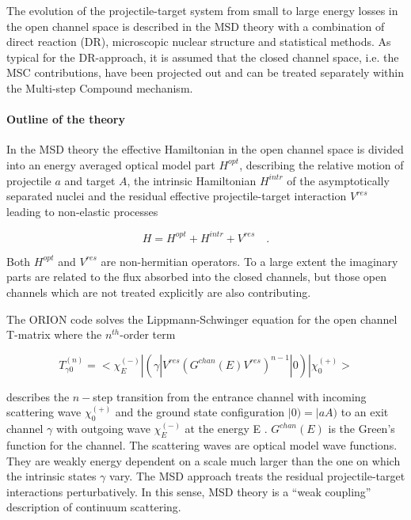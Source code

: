 \documentclass[twocolumn,amsmath,amssymb,10pt,groupedaddress,a4paper]{revtex4}
\begin{document}
The evolution of the projectile-target system from small to large
energy losses in the open channel space is described in the MSD theory
with a combination of direct reaction (DR), microscopic nuclear structure
and statistical methods. As typical for the DR-approach, it is assumed
that the closed channel space, i.e. the MSC contributions,
have been projected out and can be treated separately within the Multi-step
Compound mechanism.


\paragraph{\label{sec: MSD}Outline of the theory}

In the MSD theory the effective Hamiltonian in the open
channel space is divided into an energy averaged optical model part
$H^{opt}$, describing the relative motion of projectile $a$ and
target $A$, the intrinsic Hamiltonian $H^{intr}$ of the asymptotically
separated nuclei and the residual effective projectile-target interaction
$V^{res}$ leading to non-elastic processes

\begin{equation}
H=H^{opt}+H^{intr}+V^{res}\quad.\label{fullh}
\end{equation}

\noindent Both $H^{opt}$ and $V^{res}$ are non-hermitian operators. To a large
extent the imaginary parts are related to the flux absorbed into the
closed channels, but those open channels which are not treated explicitly
are also contributing.

The ORION code solves the Lippmann-Schwinger equation
for the open channel T-matrix where the $n^{th}$-order term

\begin{equation}
T_{\gamma0}^{(n)}=<\chi_{E}^{(-)}|(\gamma|V^{res}(G^{chan}(E)V^{res})^{n-1}|0)|\chi_{0}^{(+)}>\label{tgamman}\end{equation}

\noindent describes the $n-$step transition from the entrance channel with
incoming scattering wave $\chi_{0}^{(+)}$ and the ground state configuration
$|0)=|aA)$ to an exit channel $\gamma$ with outgoing wave $\chi_{E}^{(-)}$
at the energy E \cite{SLW,LW92}. $G^{chan}(E)$ is the Green's function
for the channel. The scattering waves are optical model wave functions.
They are weakly energy dependent on a scale much larger than the one
on which the intrinsic states $\gamma$ vary. The MSD
approach treats the residual projectile-target interactions perturbatively.
In this sense, MSD theory is a {}``weak coupling'' description of
continuum scattering.
\end{document}
